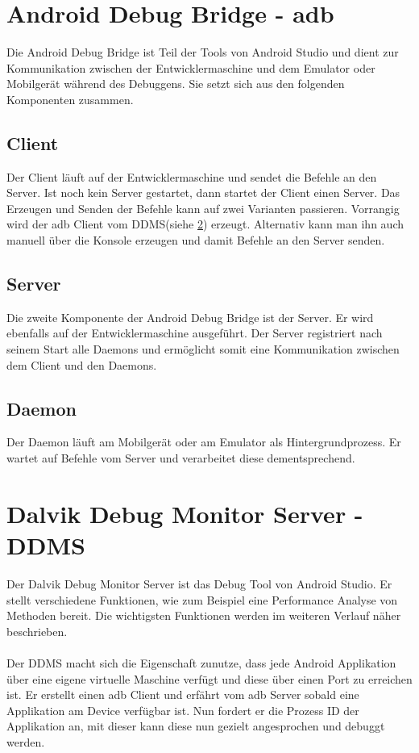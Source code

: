 \section{Android Debug Bridge - adb}
Die Android Debug Bridge ist Teil der Tools von Android Studio und dient zur Kommunikation zwischen der Entwicklermaschine und dem Emulator oder Mobilgerät während des Debuggens. Sie setzt sich aus den folgenden Komponenten zusammen.\cite{40}

\subsection{Client}
Der Client läuft auf der Entwicklermaschine und sendet die Befehle an den Server. Ist noch kein Server gestartet, dann startet der Client einen Server. Das Erzeugen und Senden der Befehle kann auf zwei Varianten passieren. Vorrangig wird der adb Client vom DDMS(siehe \ref{sec:ddms}) erzeugt. Alternativ kann man ihn auch manuell über die Konsole erzeugen und damit Befehle an den Server senden.\cite{40}

\subsection{Server}
Die zweite Komponente der Android Debug Bridge ist der Server. Er wird ebenfalls auf der Entwicklermaschine ausgeführt. Der Server registriert nach seinem Start alle Daemons und ermöglicht somit eine Kommunikation zwischen dem Client und den Daemons.\cite{40}

\subsection{Daemon}
Der Daemon läuft am Mobilgerät oder am Emulator als Hintergrundprozess. Er wartet auf Befehle vom Server und verarbeitet diese dementsprechend.\cite{40}


\section{Dalvik Debug Monitor Server - DDMS}
\label{sec:ddms}
Der Dalvik Debug Monitor Server ist das Debug Tool von Android Studio. Er stellt verschiedene Funktionen, wie zum Beispiel eine Performance Analyse von Methoden bereit. Die wichtigsten Funktionen werden im weiteren Verlauf näher beschrieben.
\\
\\
Der DDMS macht sich die Eigenschaft zunutze, dass jede Android Applikation über eine eigene virtuelle Maschine verfügt und diese über einen Port zu erreichen ist. Er erstellt einen adb Client und erfährt vom adb Server sobald eine Applikation am Device verfügbar ist. Nun fordert er die Prozess ID der Applikation an, mit dieser kann diese nun gezielt angesprochen und debuggt werden.\cite{41}


